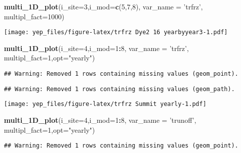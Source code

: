 \documentclass[]{article}
\newenvironment{Shaded}{\begin{snugshade}}{\end{snugshade}}
\newcommand{\DataTypeTok}[1]{\textcolor[rgb]{0.13,0.29,0.53}{#1}}
\newcommand{\DecValTok}[1]{\textcolor[rgb]{0.00,0.00,0.81}{#1}}
\newcommand{\KeywordTok}[1]{\textcolor[rgb]{0.13,0.29,0.53}{\textbf{#1}}}
\newcommand{\NormalTok}[1]{#1}
\newcommand{\OperatorTok}[1]{\textcolor[rgb]{0.81,0.36,0.00}{\textbf{#1}}}
\newcommand{\StringTok}[1]{\textcolor[rgb]{0.31,0.60,0.02}{#1}}
\begin{document}
\begin{Shaded}
\begin{Highlighting}[]
\KeywordTok{multi_1D_plot}\NormalTok{(}\DataTypeTok{i_site=}\DecValTok{3}\NormalTok{,}\DataTypeTok{i_mod=}\KeywordTok{c}\NormalTok{(}\DecValTok{5}\NormalTok{,}\DecValTok{7}\NormalTok{,}\DecValTok{8}\NormalTok{), }\DataTypeTok{var_name =} \StringTok{'trfrz'}\NormalTok{,  }\DataTypeTok{multipl_fact=}\DecValTok{1000}\NormalTok{)  }
\end{Highlighting}
\end{Shaded}

\texttt{[image: yep\_files/figure-latex/trfrz Dye2 16 yearbyyear3-1.pdf]}

\begin{Shaded}
\begin{Highlighting}[]
\KeywordTok{multi_1D_plot}\NormalTok{(}\DataTypeTok{i_site=}\DecValTok{4}\NormalTok{,}\DataTypeTok{i_mod=}\DecValTok{1}\OperatorTok{:}\DecValTok{8}\NormalTok{, }\DataTypeTok{var_name =} \StringTok{'trfrz'}\NormalTok{,  }\DataTypeTok{multipl_fact=}\DecValTok{1}\NormalTok{,}\DataTypeTok{opt=}\StringTok{"yearly"}\NormalTok{)  }
\end{Highlighting}
\end{Shaded}

\begin{verbatim}
## Warning: Removed 1 rows containing missing values (geom_point).
\end{verbatim}

\begin{verbatim}
## Warning: Removed 1 rows containing missing values (geom_path).
\end{verbatim}

\texttt{[image: yep\_files/figure-latex/trfrz Summit yearly-1.pdf]}

\begin{Shaded}
\begin{Highlighting}[]
\KeywordTok{multi_1D_plot}\NormalTok{(}\DataTypeTok{i_site=}\DecValTok{4}\NormalTok{,}\DataTypeTok{i_mod=}\DecValTok{1}\OperatorTok{:}\DecValTok{8}\NormalTok{, }\DataTypeTok{var_name =} \StringTok{'trunoff'}\NormalTok{,  }\DataTypeTok{multipl_fact=}\DecValTok{1}\NormalTok{,}\DataTypeTok{opt=}\StringTok{"yearly"}\NormalTok{)  }
\end{Highlighting}
\end{Shaded}

\begin{verbatim}
## Warning: Removed 1 rows containing missing values (geom_point).
\end{verbatim}
\end{document}
